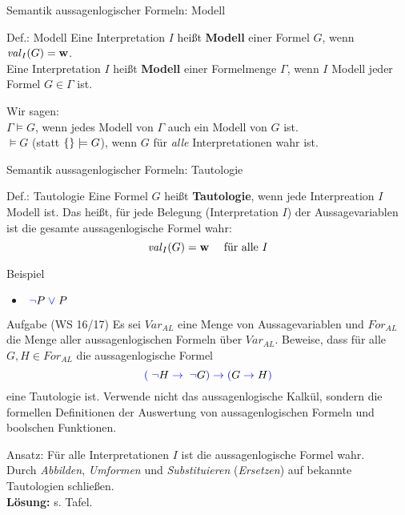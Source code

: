 \begin{frame}{Semantik aussagenlogischer Formeln: Modell}
	\begin{block}{Def.: Modell}
		Eine Interpretation $I$ heißt \textbf{Modell} einer Formel $G$, wenn $\hbox{\textit{val}}_I(G)=\mathbf{w}$.\\[2ex]

		Eine Interpretation $I$ heißt \textbf{Modell} einer Formelmenge $\Gamma$, wenn $I$ Modell jeder Formel $G\in \Gamma$ ist.
	\end{block}

	\begin{exampleblock}{}
	Wir sagen:\\
	\textcolor{black!50!red}{$\Gamma \models G$}, wenn jedes Modell von $\Gamma$ auch ein Modell von $G$ ist.\\
	\textcolor{black!50!red}{$\models G$} (statt \textcolor{black!50!red}{$\{  \}\models G$}), wenn $G$ für \emph{alle} Interpretationen wahr ist.
	\end{exampleblock}
\end{frame}

\begin{frame}{Semantik aussagenlogischer Formeln: Tautologie}
	\begin{block}{Def.: Tautologie}
		Eine Formel $G$ heißt \textbf{Tautologie}, wenn jede Interpreation $I$ Modell ist. Das heißt, für jede Belegung (Interpretation $I$) der Aussagevariablen ist die gesamte aussagenlogische Formel wahr:
			\[	\hbox{\textit{val}}_I(G)=\mathbf{w} \quad \text{ für alle } I	\]
	\end{block}

	\begin{exampleblock}{Beispiel}
		\begin{itemize}
			\item \( \text{\;}\textcolor{blue}{\neg}\text{}{} P \text{\;}\textcolor{blue}{\vee}\text{\;} P \)
		\end{itemize}
	\end{exampleblock}
\end{frame}


\begin{frame}{}
	\begin{exampleblock}{Aufgabe (WS 16/17)}
		Es sei \(Var_{AL}\) eine Menge von Aussagevariablen und \(For_{AL}\) die Menge aller aussagenlogischen Formeln über \(Var_{AL}\). Beweise, dass für alle \(G, H \in For_{AL}\) die aussagenlogische Formel
				\[	\textcolor{blue}{(}\text{}{} \text{\;}\textcolor{blue}{\neg}\text{}{} H\text{\;}\textcolor{blue}{\to}\text{\;}{} \text{\;}\textcolor{blue}{\neg}\text{}{} G \textcolor{blue}{)}\text{}{} \text{\;}\textcolor{blue}{\to}\text{\;}{} \textcolor{blue}{(}\text{}{} G \text{\;}\textcolor{blue}{\to}\text{\;}{} H \textcolor{blue}{)}\text{}{}\]
		eine Tautologie ist. Verwende nicht das aussagenlogische Kalkül, sondern die formellen Definitionen der Auswertung von aussagenlogischen Formeln und boolschen Funktionen.
	\end{exampleblock}
	\begin{block}{Ansatz:}
		\zz Für alle Interpretationen $I$ ist die aussagenlogische Formel wahr.\\[1ex]
		Durch \emph{Abbilden}, \emph{Umformen} und \emph{Substituieren} (\emph{Ersetzen}) auf bekannte Tautologien schließen.\\[1ex]
		\textbf{Lösung:} s. Tafel.
	\end{block}
\end{frame}

